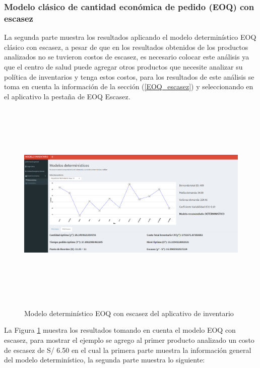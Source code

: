 \subsubsection{Modelo clásico de cantidad económica de pedido (EOQ) con escasez}

La segunda parte muestra los resultados aplicando el modelo determinístico EOQ clásico con escasez, a pesar de que en los resultados obtenidos de los productos analizados no se tuvieron costos de escasez, es necesario colocar este análisis ya que el centro de salud puede agregar otros productos que necesite analizar su política de inventarios y tenga estos costos, para los resultados de este análisis se toma en cuenta la información de la sección (\ref{EOQ_escasez}) y seleccionando en el aplicativo la pestaña de EOQ Escasez.

\begin{figure}[H]
  \caption{Modelo determinístico EOQ con escasez del aplicativo de inventario}
  {\includegraphics[width=16cm, height=10cm]{images/Shiny7.png}}
  \label{fig:Shiny7}
\end{figure}

La Figura \ref{fig:Shiny7} muestra los resultados tomando en cuenta el modelo EOQ con escasez, para mostrar el ejemplo se agrego al primer producto analizado un costo de escasez de S/ 6.50 en el cual la primera parte muestra la información general del modelo determinístico, la segunda parte muestra lo siguiente:

